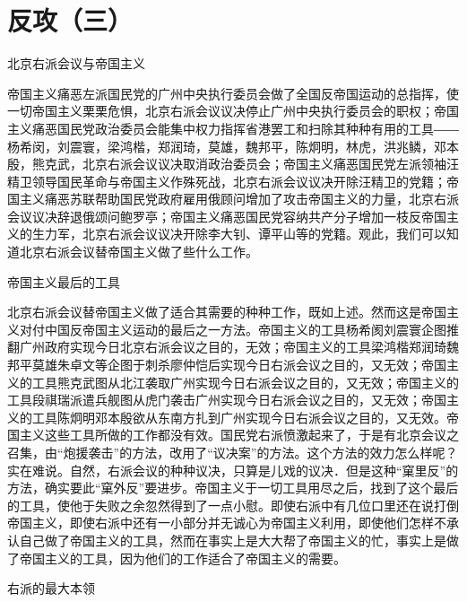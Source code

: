 \section[反攻（三）]{反攻（三）}


北京右派会议与帝国主义

帝国主义痛恶左派国民党的广州中央执行委员会做了全国反帝国运动的总指挥，使一切帝国主义栗栗危惧，北京右派会议议决停止广州中央执行委员会的职权；帝国主义痛恶国民党政治委员会能集中权力指挥省港罢工和扫除其种种有用的工具――杨希闵，刘震寰，梁鸿楷，郑润琦，莫雄，魏邦平，陈炯明，林虎，洪兆鳞，邓本殷，熊克武，北京右派会议议决取消政治委员会；帝国主义痛恶国民党左派领袖汪精卫领导国民革命与帝国主义作殊死战，北京右派会议议决开除汪精卫的党籍；帝国主义痛恶苏联帮助国民党政府雇用俄顾问增加了攻击帝国主义的力量，北京右派会议议决辞退俄颂问鲍罗亭；帝国主义痛恶国民党容纳共产分子增加一枝反帝国主义的生力军，北京右派会议议决开除李大钊、谭平山等的党籍。观此，我们可以知道北京右派会议替帝国主义做了些什么工作。

帝国主义最后的工具

北京右派会议替帝国主义做了适合其需要的种种工作，既如上述。然而这是帝国主义对付中国反帝国主义运动的最后之一方法。帝国主义的工具杨希阂刘震寰企图推翻广州政府实现今日北京右派会议之目的，无效；帝国主义的工具梁鸿楷郑润琦魏邦平莫雄朱卓文等企图于刺杀廖仲恺后实现今日右派会议之目的，又无效；帝国主义的工具熊克武图从北江袭取广州实现今日右派会议之目的，又无效；帝国主义的工具段祺瑞派遣兵舰图从虎门袭击广州实现今日右派会议之目的，又无效；帝国主义的工具陈炯明邓本殷欲从东南方扎到广州实现今日右派会议之目的，又无效。帝国主义这些工具所做的工作都没有效。国民党右派愤激起来了，于是有北京会议之召集，由“炮援袭击”的方法，改用了“议决案”的方法。这个方法的效力怎么样呢？实在难说。自然，右派会议的种种议决，只算是儿戏的议决．但是这种“窠里反”的方法，确实要此“窠外反”要进步。帝国主义于一切工具用尽之后，找到了这个最后的工具，使他于失败之余忽然得到了一点小慰。即使右派中有几位口里还在说打倒帝国主义，即使右派中还有一小部分并无诚心为帝国主义利用，即使他们怎样不承认自己做了帝国主义的工具，然而在事实上是大大帮了帝国主义的忙，事实上是做了帝国主义的工具，因为他们的工作适合了帝国主义的需要。

右派的最大本领

